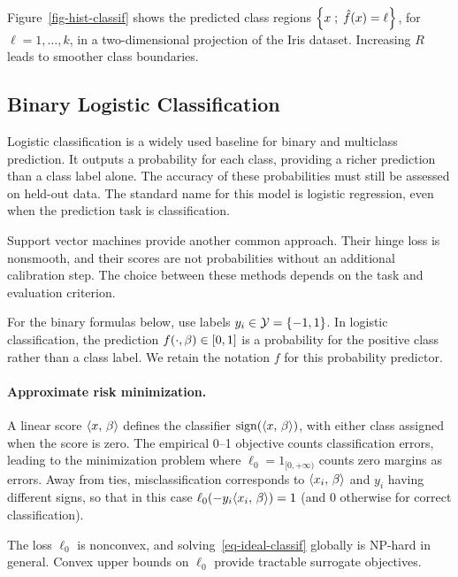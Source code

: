 Figure~\ref{fig-hist-classif} shows the predicted class regions $\left\{ x \;;\; \hat f(x)=\ell \right\}$, for $\ell=1,\ldots,k$, in a two-dimensional projection of the Iris dataset.
%
Increasing $R$ leads to smoother class boundaries.

\subsection{Binary Logistic Classification}
\label{sec-two-class-logit}

Logistic classification is a widely used baseline for binary and multiclass prediction. It outputs a probability for each class, providing a richer prediction than a class label alone. The accuracy of these probabilities must still be assessed on held-out data.
%
The standard name for this model is logistic regression, even when the prediction task is classification.

Support vector machines provide another common approach. Their hinge loss is nonsmooth, and their scores are not probabilities without an additional calibration step. The choice between these methods depends on the task and evaluation criterion.

For the binary formulas below, use labels $y_i \in \mathcal{Y} = \{-1,1\}$. In logistic classification, the prediction $f(\cdot,\beta) \in [0,1]$ is a probability for the positive class rather than a class label. We retain the notation $f$ for this probability predictor.


\paragraph{Approximate risk minimization.}

A linear score $\langle x,\,\beta\rangle$ defines the classifier $\operatorname{sign}(\langle x,\,\beta\rangle)$, with either class assigned when the score is zero. The empirical 0--1 objective counts classification errors, leading to the minimization problem
where $\ell_0=1_{[0,+\infty)}$ counts zero margins as errors. Away from ties, misclassification corresponds to $\langle x_i,\,\beta\rangle$ and $y_i$ having different signs, so that in this case $\ell_0(-y_i \langle x_i,\,\beta\rangle)=1$ (and 0 otherwise for correct classification).

The loss $\ell_0$ is nonconvex, and solving~\eqref{eq-ideal-classif} globally is NP-hard in general. Convex upper bounds on $\ell_0$ provide tractable surrogate objectives.

